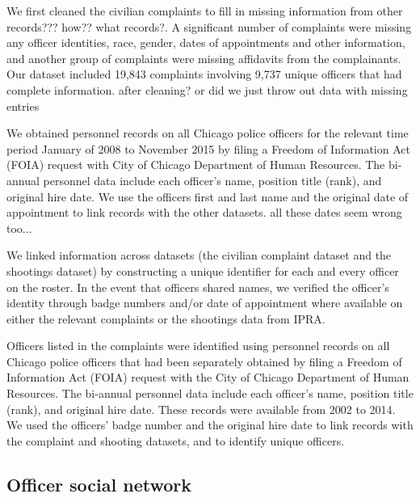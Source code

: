 We first cleaned the civilian complaints to fill in missing information from
{\color{red} other records??? how?? what records?}. A significant number of complaints were missing any officer
identities, race, gender, dates of appointments and other information, and
another group of complaints were missing affidavits from the complainants. Our
dataset included 19,843 complaints involving 9,737 unique officers that had
complete information. {\color{red} after cleaning? or did we just throw out data with missing entries}

We obtained personnel records on all Chicago police officers for the relevant
time period January of 2008 to November 2015 by filing a Freedom of Information
Act (FOIA) request with City of Chicago Department of Human Resources. The
bi-annual personnel data include each officer's name, position title (rank),
and original hire date. We use the officers first and last name and the
original date of appointment to link records with the other datasets. 
{\color{red} all these dates seem wrong too...}
 
 We linked information across datasets (the civilian complaint dataset and the
shootings dataset) by constructing a unique identifier for each and every
officer on the roster. In the event that officers shared names, we verified the
officer’s identity through badge numbers and/or date of appointment where
available on either the relevant complaints or the shootings data from IPRA.

Officers listed in the complaints were identified using personnel records on
all Chicago police officers that had been separately obtained by filing a
Freedom of Information Act (FOIA) request with the City of Chicago Department
of Human Resources. The bi-annual personnel data include each officer's name,
position title (rank), and original hire date. These records were available
from 2002 to 2014. We used the officers’ badge number and the original hire
date to link records with the complaint and shooting datasets, and to identify
unique officers. 

\subsection{Officer social network}


